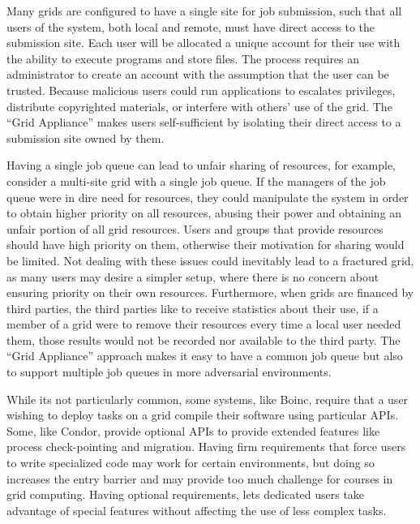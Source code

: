 \documentclass[conference]{IEEEtran}
\begin{document}
Many grids are configured to have a single site for job submission, such that
all users of the system, both local and remote, must have direct access to the
submission site.  Each user will be allocated a unique account for their use
with the ability to execute programs and store files.  The process requires an
administrator to create an account with the assumption that the user can be
trusted.  Because malicious users could run applications to escalates
privileges, distribute copyrighted materials, or interfere with others' use of
the grid.  The ``Grid Appliance'' makes users self-sufficient by isolating
their direct access to a submission site owned by them.  

Having a single job queue can lead to unfair sharing of resources, for example,
consider a multi-site grid with a single job queue.  If the managers of the job
queue were in dire need for resources, they could manipulate the system in
order to obtain higher priority on all resources, abusing their power and
obtaining an unfair portion of all grid resources.  Users and groups that
provide resources should have high priority on them, otherwise their
motivation for sharing would be limited.  Not dealing with these issues could
inevitably lead to a fractured grid, as many users may desire a simpler setup,
where there is no concern about ensuring priority on their own resources.
Furthermore, when grids are financed by third parties, the third parties like
to receive statistics about their use, if a member of a grid were to remove
their resources every time a local user needed them, those results would not be
recorded nor available to the third party.  The ``Grid Appliance'' approach
makes it easy to have a common job queue but also to support multiple job
queues in more adversarial environments.

While its not particularly common, some systems, like Boinc, require that a
user wishing to deploy tasks on a grid compile their software using particular
APIs.  Some, like Condor, provide optional APIs to provide extended features
like process check-pointing and migration.  Having firm requirements that force
users to write specialized code may work for certain environments, but doing so
increases the entry barrier and may provide too much challenge for courses in
grid computing.  Having optional requirements, lets dedicated users take
advantage of special features without affecting the use of less complex tasks.

\addtocounter{footnote}{1}
\addtocounter{footnote}{1}
\addtocounter{footnote}{1}
\end{document}
